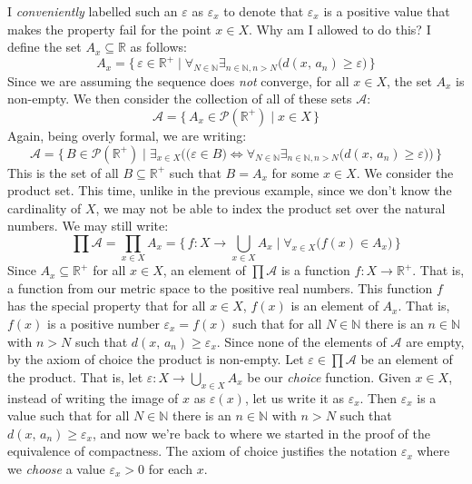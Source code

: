 \documentclass{article}
\theoremstyle{normal}
\begin{document}
    I \textit{conveniently} labelled such an $\varepsilon$ as
    $\varepsilon_{x}$ to denote that $\varepsilon_{x}$ is a positive value that
    makes the property fail for the point $x\in{X}$. Why am I allowed to do
    this? I define the set $A_{x}\subseteq\mathbb{R}$ as follows:
    \begin{equation}
        A_{x}=\big\{\,\varepsilon\in\mathbb{R}^{+}\;|\;
            \forall_{N\in\mathbb{N}}
            \exists_{n\in\mathbb{N},n>N}\big(d(x,\,a_{n})\geq\varepsilon\big)
        \,\big\}
    \end{equation}
    Since we are assuming the sequence does \textit{not} converge, for all
    $x\in{X}$, the set $A_{x}$ is non-empty. We then consider the collection
    of all of these sets $\mathcal{A}$:
    \begin{equation}
        \mathcal{A}=\{\,A_{x}\in\mathcal{P}(\mathbb{R}^{+})\;|\;x\in{X}\,\}
    \end{equation}
    Again, being overly formal, we are writing:
    \begin{equation}
        \mathcal{A}=\Big\{\,B\in\mathcal{P}(\mathbb{R}^{+})\;\big|\;
            \exists_{x\in{X}}\Big(\big(\varepsilon\in{B}\big)\Leftrightarrow
            \forall_{N\in\mathbb{N}}
            \exists_{n\in\mathbb{N},n>N}\big(d(x,\,a_{n})\geq\varepsilon\big)
            \Big)
        \,\Big\}
    \end{equation}
    This is the set of all $B\subseteq\mathbb{R}^{+}$ such that
    $B=A_{x}$ for some $x\in{X}$. We consider the product set. This time,
    unlike in the previous example, since we don't know the cardinality of
    $X$, we may not be able to index the product set over the natural numbers.
    We may still write:
    \begin{equation}
        \prod\mathcal{A}=\prod_{x\in{X}}A_{x}
            =\big\{\,f:X\rightarrow\bigcup_{x\in{X}}A_{x}\;|\;
                \forall_{x\in{X}}\big(f(x)\in{A}_{x}\big)\,\big\}
    \end{equation}
    Since $A_{x}\subseteq\mathbb{R}^{+}$ for all $x\in{X}$, an element
    of $\prod\mathcal{A}$ is a function $f:X\rightarrow\mathbb{R}^{+}$.
    That is, a function from our metric space to the positive real numbers.
    This function $f$ has the special property that for all $x\in{X}$,
    $f(x)$ is an element of $A_{x}$. That is, $f(x)$ is a positive
    number $\varepsilon_{x}=f(x)$ such that for all $N\in\mathbb{N}$ there is
    an $n\in\mathbb{N}$ with $n>N$ such that
    $d(x,\,a_{n})\geq\varepsilon_{x}$. Since none of the elements of
    $\mathcal{A}$ are empty, by the axiom of choice the product is non-empty.
    Let $\varepsilon\in\prod\mathcal{A}$ be an element of the product. That is,
    let $\varepsilon:X\rightarrow\bigcup_{x\in{X}}A_{x}$ be our
    \textit{choice} function. Given $x\in{X}$, instead of writing the image of
    $x$ as $\varepsilon(x)$, let us write it as $\varepsilon_{x}$. Then
    $\varepsilon_{x}$ is a value such that for all $N\in\mathbb{N}$ there is
    an $n\in\mathbb{N}$ with $n>N$ such that
    $d(x,\,a_{n})\geq\varepsilon_{x}$, and now we're back to where we started
    in the proof of the equivalence of compactness. The axiom of choice
    justifies the notation $\varepsilon_{x}$ where we \textit{choose} a value
    $\varepsilon_{x}>0$ for each $x$.
\end{document}
